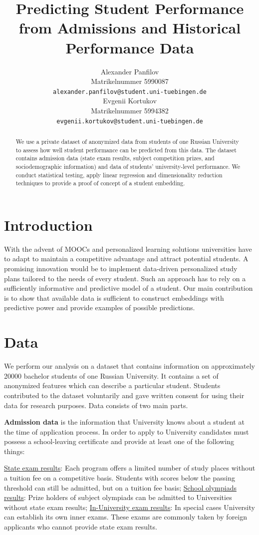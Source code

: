 \documentclass{article}
\title{Predicting Student Performance\\ from Admissions and Historical Performance Data}
\author{%
  Alexander Panfilov\\
  Matrikelnummer 5990087\\
  \texttt{alexander.panfilov@student.uni-tuebingen.de} \\
  \And
  Evgenii Kortukov\\
  Matrikelnummer 5994382\\
  \texttt{evgenii.kortukov@student.uni-tuebingen.de} \\
}
\begin{document}
\maketitle

\begin{abstract}
  We use a private dataset of anonymized data from students of
  one Russian University to assess how well student performance can be
  predicted from this data. The dataset contains admission data (state exam results, subject competition prizes, and sociodemographic
  information) and data of students’ university-level performance. We conduct statistical testing, apply linear
  regression and dimensionality reduction techniques to provide a proof of concept of a student embedding.
\end{abstract}

\section{Introduction}
\label{sec:intro}
With the advent of MOOCs and personalized learning solutions universities have to adapt to maintain a competitive advantage and attract potential students. A promising innovation would be to implement data-driven personalized study plans tailored to the needs of every student. Such an approach has to rely on a sufficiently informative and predictive model of a student. Our main contribution is to show that available data is sufficient to construct embeddings with predictive power and provide examples of possible predictions.

\section{Data}
\label{sec:data}
We perform our analysis on a dataset that contains information on approximately 20000 bachelor students of one Russian University. It contains a set of anonymized features which can describe a particular student. Students contributed to the dataset voluntarily and gave written consent for using their data for research purposes. Data consists of two main parts.

\textbf{Admission data} is the information that University knows about a student at the time of application process. In order to apply to University candidates must possess a school-leaving certificate and provide at least one of the following things:

\underline{State exam results}: Each program offers a limited number of study places without a tuition fee on a competitive basis. Students with scores below the passing threshold can still be admitted, but on a tuition fee basis;
\underline{School olympiads results}: Prize holders of subject olympiads can be admitted to Universities without state exam results;
\underline{In-University exam results}: In special cases University can establish its own inner exams. These exams are commonly taken by foreign applicants who cannot provide state exam results.
\end{document}
